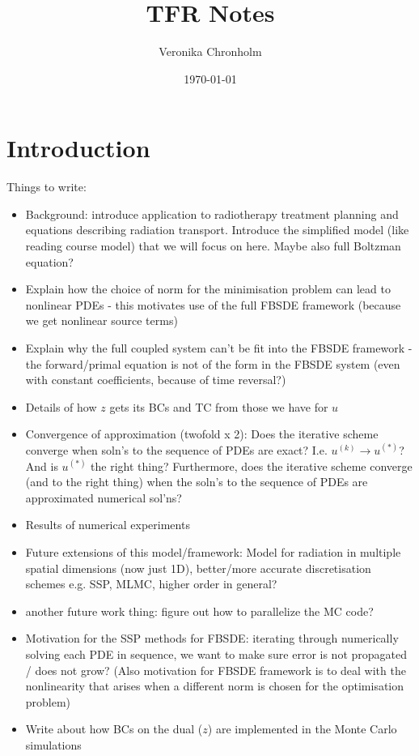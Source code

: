 \documentclass{article}  %
\title{TFR Notes}
\author{Veronika Chronholm}
\date{\today}
\begin{document}
\maketitle

\section{Introduction}
Things to write:
\begin{itemize}
    \item Background: introduce application to radiotherapy treatment planning and equations describing radiation transport. Introduce the simplified model (like reading course model) that we will focus on here. Maybe also full Boltzman equation?
    \item Explain how the choice of norm for the minimisation problem can lead to nonlinear PDEs - this motivates use of the full FBSDE framework (because we get nonlinear source terms)
    \item Explain why the full coupled system can't be fit into the FBSDE framework - the forward/primal equation is not of the form in the FBSDE system (even with constant coefficients, because of time reversal?)
    \item Details of how $z$ gets its BCs and TC from those we have for $u$
    \item Convergence of approximation (twofold x 2): Does the iterative scheme converge when soln's to the sequence of PDEs are exact? I.e. $u^{(k)} \rightarrow u^{(*)}$? And is $u^{(*)}$ the right thing? Furthermore, does the iterative scheme converge (and to the right thing) when the soln's to the sequence of PDEs are approximated numerical sol'ns?
    \item Results of numerical experiments
    \item Future extensions of this model/framework: Model for radiation in multiple spatial dimensions (now just 1D), better/more accurate discretisation schemes e.g. SSP, MLMC, higher order in general?
    \item another future work thing: figure out how to parallelize the MC code?
    \item Motivation for the SSP methods for FBSDE: iterating through numerically solving each PDE in sequence, we want to make sure error is not propagated / does not grow? (Also motivation for FBSDE framework is to deal with the nonlinearity that arises when a different norm is chosen for the optimisation problem)
    \item Write about how BCs on the dual ($z$) are implemented in the Monte Carlo simulations
\end{itemize}
\end{document}
